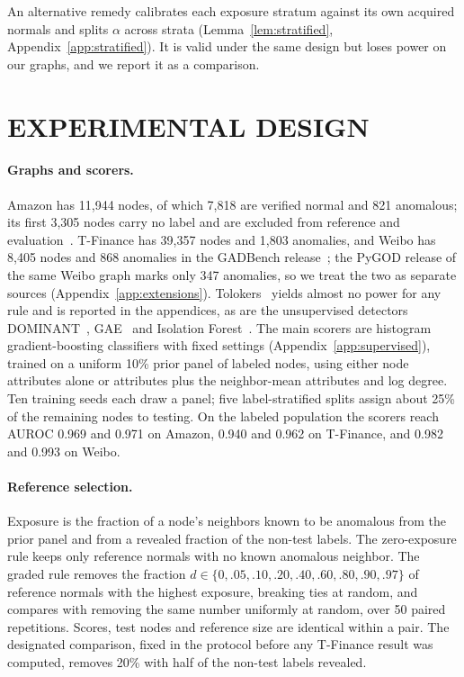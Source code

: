 \documentclass[twoside]{article}
\begin{document}
An alternative remedy calibrates each exposure stratum against its own acquired normals and splits $\alpha$ across strata (Lemma~\ref{lem:stratified}, Appendix~\ref{app:stratified}). It is valid under the same design but loses power on our graphs, and we report it as a comparison.

\section{EXPERIMENTAL DESIGN}
\paragraph{Graphs and scorers.}
Amazon has 11,944 nodes, of which 7,818 are verified normal and 821 anomalous; its first 3,305 nodes carry no label and are excluded from reference and evaluation~\citep{dou2020enhancing,dglfraud}. T-Finance has 39,357 nodes and 1,803 anomalies, and Weibo has 8,405 nodes and 868 anomalies in the GADBench release~\citep{tang2023gadbench}; the PyGOD release of the same Weibo graph marks only 347 anomalies, so we treat the two as separate sources (Appendix~\ref{app:extensions}). Tolokers~\citep{platonov2023critical} yields almost no power for any rule and is reported in the appendices, as are the unsupervised detectors DOMINANT~\citep{ding2019deep}, GAE~\citep{liu2024pygod} and Isolation Forest~\citep{liu2008isolation}. The main scorers are histogram gradient-boosting classifiers with fixed settings (Appendix~\ref{app:supervised}), trained on a uniform 10\% prior panel of labeled nodes, using either node attributes alone or attributes plus the neighbor-mean attributes and log degree. Ten training seeds each draw a panel; five label-stratified splits assign about 25\% of the remaining nodes to testing. On the labeled population the scorers reach AUROC 0.969 and 0.971 on Amazon, 0.940 and 0.962 on T-Finance, and 0.982 and 0.993 on Weibo.

\paragraph{Reference selection.}
Exposure is the fraction of a node's neighbors known to be anomalous from the prior panel and from a revealed fraction of the non-test labels. The zero-exposure rule keeps only reference normals with no known anomalous neighbor. The graded rule removes the fraction $d\in\{0,.05,.10,.20,.40,.60,.80,.90,.97\}$ of reference normals with the highest exposure, breaking ties at random, and compares with removing the same number uniformly at random, over 50 paired repetitions. Scores, test nodes and reference size are identical within a pair. The designated comparison, fixed in the protocol before any T-Finance result was computed, removes 20\% with half of the non-test labels revealed.
\end{document}

